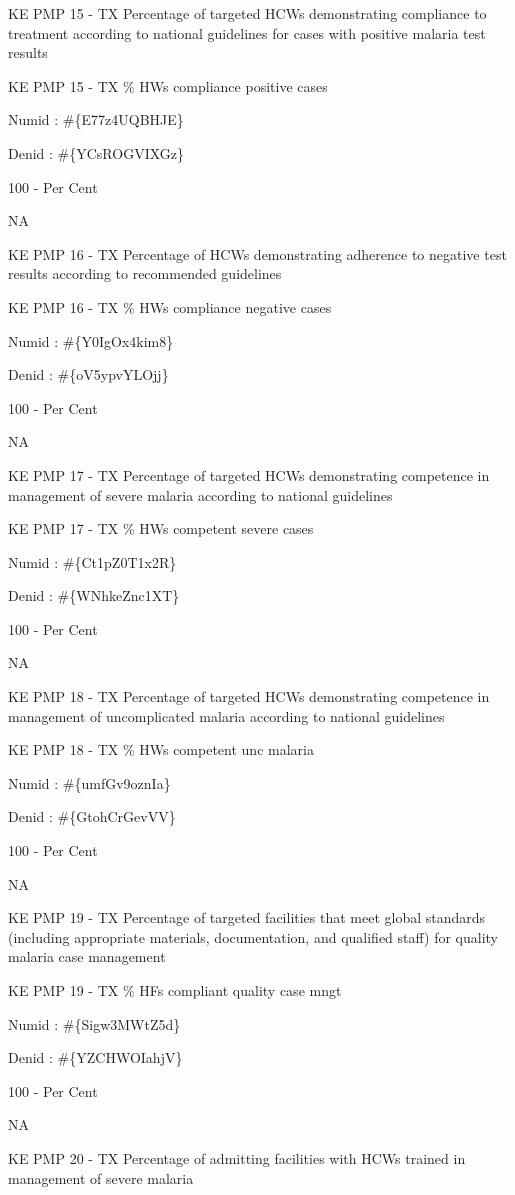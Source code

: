 \documentclass[]{book}
\begin{document}
KE PMP 15 - TX Percentage of targeted HCWs demonstrating compliance to treatment according to national guidelines for cases with positive malaria test results

KE PMP 15 - TX \% HWs compliance positive cases

Numid : \#\{E77z4UQBHJE\}

Denid : \#\{YCsROGVIXGz\}

100 - Per Cent

NA

KE PMP 16 - TX Percentage of HCWs demonstrating adherence to negative test results according to recommended guidelines

KE PMP 16 - TX \% HWs compliance negative cases

Numid : \#\{Y0IgOx4kim8\}

Denid : \#\{oV5ypvYLOjj\}

100 - Per Cent

NA

KE PMP 17 - TX Percentage of targeted HCWs demonstrating competence in management of severe malaria according to national guidelines

KE PMP 17 - TX \% HWs competent severe cases

Numid : \#\{Ct1pZ0T1x2R\}

Denid : \#\{WNhkeZnc1XT\}

100 - Per Cent

NA

KE PMP 18 - TX Percentage of targeted HCWs demonstrating competence in management of uncomplicated malaria according to national guidelines

KE PMP 18 - TX \% HWs competent unc malaria

Numid : \#\{umfGv9oznIa\}

Denid : \#\{GtohCrGevVV\}

100 - Per Cent

NA

KE PMP 19 - TX Percentage of targeted facilities that meet global standards (including appropriate materials, documentation, and qualified staff) for quality malaria case management

KE PMP 19 - TX \% HFs compliant quality case mngt

Numid : \#\{Sigw3MWtZ5d\}

Denid : \#\{YZCHWOIahjV\}

100 - Per Cent

NA

KE PMP 20 - TX Percentage of admitting facilities with HCWs trained in management of severe malaria
\end{document}
